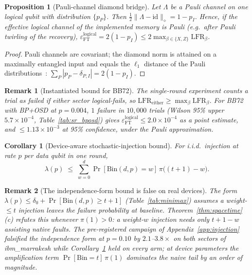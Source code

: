 \documentclass[11pt,a4paper]{article}
\newtheorem{corollary}{Corollary}\newtheorem{proposition}{Proposition}
\newtheorem{remark}{Remark}
\begin{document}
\begin{proposition}[Pauli-channel diamond bridge]\label{prop:bridge}
Let $\Lambda$ be a Pauli channel on one logical qubit with distribution
$\{p_P\}$. Then $\tfrac12\|\Lambda-\mathrm{id}\|_\diamond=1-p_I$.
Hence, if the effective logical channel of the implemented memory is
Pauli (e.g.\ after Pauli twirling of the recovery),
$\varepsilon_{\mathrm{FT}}^{\mathrm{logical}}=2(1-p_I)\le
2\max_{\beta\in\{X,Z\}}\mathrm{LFR}_\beta$.
\end{proposition}
\begin{proof}
Pauli channels are covariant; the diamond norm is attained on a
maximally entangled input and equals the $\ell_1$ distance of the Pauli
distributions~\cite{Watrous2018}: $\sum_P|p_P-\delta_{P,I}|=2(1-p_I)$.
\end{proof}
\begin{remark}[Instantiated bound for BB72]\label{rem:bridge-number}
The single-round experiment counts a trial as failed if either sector
logical-fails, so $\mathrm{LFR}_{\mathrm{either}}\ge
\max_{\beta}\mathrm{LFR}_{\beta}$. For BB72 with BP+OSD at $p=0.004$,
$1$ failure in $10{,}000$ trials (Wilson 95\% upper $5.7\times10^{-4}$,
Table~\ref{tab:sr_bposd}) gives
$\varepsilon_{\mathrm{FT}}^{\mathrm{logical}}\le2.0\times10^{-4}$ as a
point estimate, and $\le1.13\times10^{-3}$ at 95\% confidence, under
the Pauli approximation.
\end{remark}

\begin{corollary}[Device-aware stochastic-injection bound]\label{cor:stoch}
For i.i.d.\ injection at rate $p$ per data qubit in one round,
\[
\lambda(p)\;\le\;\sum_{w=0}^{d}\Pr[\mathrm{Bin}(d,p)=w]\,
\pi\bigl((t{+}1)-w\bigr).
\]
\end{corollary}

\begin{remark}[The independence-form bound is false on real devices]
\label{rem:naive-false}
The form $\lambda(p)\le\delta_0+\Pr[\mathrm{Bin}(d,p)\ge t{+}1]$
(Table~\ref{tab:minimax}) assumes a weight-$\le t$ injection leaves the
failure probability at baseline. Theorem~\ref{thm:spacetime}(c) refutes
this whenever $\pi(1)>0$: a weight-$w$ injection needs only
$t{+}1{-}w$ assisting native faults. The pre-registered campaign of
Appendix~\ref{app:injection} falsified the independence form at
$p=0.10$ by $2.1$--$3.8\times$ on both sectors of ibm\_marrakesh while
Corollary~\ref{cor:stoch} held on every arm; at device parameters the
amplification term $\Pr[\mathrm{Bin}=t]\,\pi(1)$ dominates the naive
tail by an order of magnitude.
\end{remark}
\end{document}
